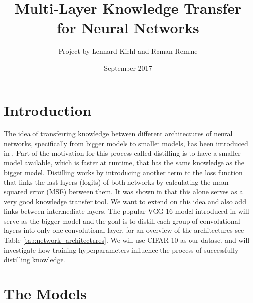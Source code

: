 \documentclass[]{scrartcl}
\title{Multi-Layer Knowledge Transfer for Neural Networks}
\author{Project by Lennard Kiehl and Roman Remme}
\date{September 2017}
\begin{document}
	

\maketitle

\tableofcontents
\newpage


\section{Introduction}
The idea of transferring knowledge between different architectures of neural networks, specifically from bigger models to smaller models, has been introduced in \cite{hinton2015distilling}. Part of the motivation for this process called distilling is to have a smaller model available, which is faster at runtime, that has the same knowledge as the bigger model. Distilling works by introducing another term to the loss function that links the last layers (logits) of both networks by calculating the mean squared error (MSE) between them. It was shown in \cite{hinton2015distilling} that this alone serves as a very good knowledge transfer tool. We want to extend on this idea and also add links between intermediate layers. The popular VGG-16 model introduced in \cite{DBLP:journals/corr/SimonyanZ14a} will serve as the bigger model and the goal is to distill each group of convolutional layers into only one convolutional layer, for an overview of the architectures see Table \ref{tab:network_architectures}. We will use CIFAR-10 \cite{krizhevsky2009learning} as our dataset and will investigate how training hyperparameters influence the process of successfully distilling knowledge.

\section{The Models}
\end{document}
